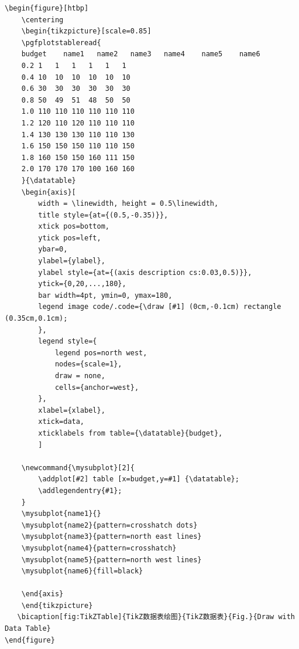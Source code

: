 {\wuhao
\begin{lstlisting}
\begin{figure}[htbp]
    \centering
	\begin{tikzpicture}[scale=0.85]
	\pgfplotstableread{
	budget    name1   name2   name3   name4    name5    name6
	0.2 1   1   1   1   1   1
	0.4 10  10  10  10  10  10
	0.6 30  30  30  30  30  30
	0.8 50  49  51  48  50  50
	1.0 110 110 110 110 110 110
	1.2 120 110 120 110 110 110
	1.4 130 130 130 110 110 130
	1.6 150 150 150 110 110 150
	1.8 160 150 150 160 111 150
	2.0 170 170 170 100 160 160
	}{\datatable}
	\begin{axis}[
	    width = \linewidth, height = 0.5\linewidth,
	    title style={at={(0.5,-0.35)}},
	    xtick pos=bottom,
	    ytick pos=left,
	    ybar=0,
	    ylabel={ylabel},
	    ylabel style={at={(axis description cs:0.03,0.5)}},
	    ytick={0,20,...,180},
	    bar width=4pt, ymin=0, ymax=180,
	    legend image code/.code={\draw [#1] (0cm,-0.1cm) rectangle (0.35cm,0.1cm);
	    },
	    legend style={
	        legend pos=north west,
	        nodes={scale=1},
	        draw = none,
	        cells={anchor=west},
	    },
	    xlabel={xlabel},
	    xtick=data,
	    xticklabels from table={\datatable}{budget},
	    ]

	\newcommand{\mysubplot}[2]{
	    \addplot[#2] table [x=budget,y=#1] {\datatable};
	    \addlegendentry{#1};
	}
	\mysubplot{name1}{}
	\mysubplot{name2}{pattern=crosshatch dots}
	\mysubplot{name3}{pattern=north east lines}
	\mysubplot{name4}{pattern=crosshatch}
	\mysubplot{name5}{pattern=north west lines}
	\mysubplot{name6}{fill=black}

	\end{axis}
	\end{tikzpicture}
   \bicaption[fig:TikZTable]{TikZ数据表绘图}{TikZ数据表}{Fig.}{Draw with Data Table}
\end{figure}
\end{lstlisting}
}

